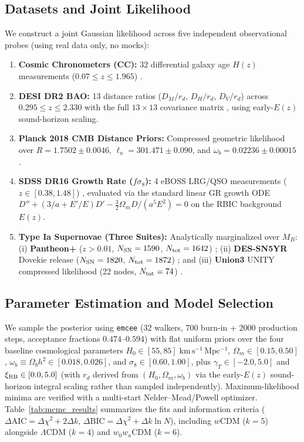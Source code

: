 \documentclass[preprint,12pt]{elsarticle}
\begin{document}
\subsection{Datasets and Joint Likelihood}
We construct a joint Gaussian likelihood across five independent observational probes (using real data only, no mocks):
\begin{enumerate}
    \item \textbf{Cosmic Chronometers (CC):} 32 differential galaxy age $H(z)$ measurements ($0.07 \le z \le 1.965$) \cite{Moresco2022}.
    \item \textbf{DESI DR2 BAO:} 13 distance ratios ($D_M/r_d$, $D_H/r_d$, $D_V/r_d$) across $0.295 \le z \le 2.330$ with the full $13\times 13$ covariance matrix \cite{DESI2025_DR2}, using early-$E(z)$ sound-horizon scaling.
    \item \textbf{Planck 2018 CMB Distance Priors:} Compressed geometric likelihood over $R = 1.7502 \pm 0.0046$, $\ell_a = 301.471 \pm 0.090$, and $\omega_b = 0.02236 \pm 0.00015$ \cite{Planck2020, Chen2019}.
    \item \textbf{SDSS DR16 Growth Rate ($f\sigma_8$):} 4 eBOSS LRG/QSO measurements ($z \in [0.38, 1.48]$) \cite{Alam2021}, evaluated via the standard linear GR growth ODE $D'' + (3/a + E'/E)D' - \frac{3}{2}\Omega_m D/(a^5 E^2) = 0$ on the RBIC background $E(z)$.
    \item \textbf{Type Ia Supernovae (Three Suites):} Analytically marginalized over $M_B$: (i) \textbf{Pantheon+} ($z>0.01$, $N_{\rm SN}=1590$, $N_{\rm tot}=1642$) \cite{Brout2022}; (ii) \textbf{DES-SN5YR} Dovekie release ($N_{\rm SN}=1820$, $N_{\rm tot}=1872$) \cite{Vincenzi2024}; and (iii) \textbf{Union3} UNITY compressed likelihood (22 nodes, $N_{\rm tot}=74$) \cite{Rubin2025}.
\end{enumerate}

\subsection{Parameter Estimation and Model Selection}
We sample the posterior using \texttt{emcee} \cite{Foreman-Mackey2013} (32 walkers, 700 burn-in + 2000 production steps, acceptance fractions $0.474\text{--}0.594$) with flat uniform priors over the four baseline cosmological parameters $H_0 \in [55, 85]\;\mathrm{km\,s^{-1}\,Mpc^{-1}}$, $\Omega_m \in [0.15, 0.50]$, $\omega_b \equiv \Omega_b h^2 \in [0.018, 0.026]$, and $\sigma_8 \in [0.60, 1.00]$, plus $\gamma_T \in [-2.0, 5.0]$ and $\xi_{\rm RB} \in [0.0, 5.0]$ (with $r_d$ derived from $(H_0,\Omega_m,\omega_b)$ via the early-$E(z)$ sound-horizon integral scaling rather than sampled independently). Maximum-likelihood minima are verified with a multi-start Nelder--Mead/Powell optimizer. Table~\ref{tab:mcmc_results} summarizes the fits and information criteria ($\Delta\mathrm{AIC} = \Delta\chi^2 + 2\Delta k$, $\Delta\mathrm{BIC} = \Delta\chi^2 + \Delta k\ln N$), including $w$CDM ($k=5$) alongside $\Lambda$CDM ($k=4$) and $w_0w_a$CDM ($k=6$).
\end{document}
